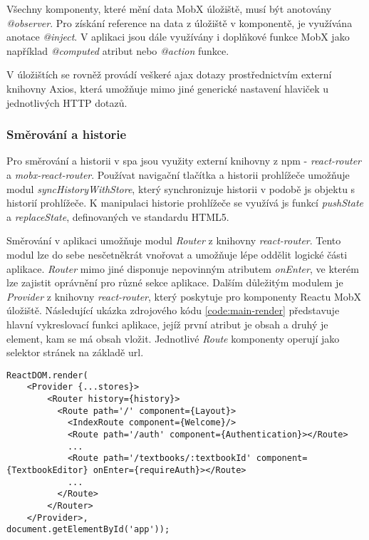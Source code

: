 \documentclass[a4paper,11pt,titlepage,fleqn]{article}
\begin{document}
            Všechny komponenty, které mění data MobX úložiště, musí být anotovány \textit{@observer}. Pro získání reference na data z úložiště v komponentě, je využívána anotace \textit{@inject}. V aplikaci jsou dále využívány i doplňkové funkce MobX jako například \textit{@computed} atribut nebo \textit{@action} funkce. 

            V úložištích se rovněž provádí veškeré \gls{ajax} dotazy prostřednictvím externí knihovny Axios, která umožňuje mimo jiné generické nastavení hlaviček u jednotlivých HTTP dotazů. 
        
        \subsubsection{Směrování a historie}
            Pro směrování a historii v \gls{spa} jsou využity externí knihovny z \gls{npm} - \textit{react-router} a \textit{mobx-react-router}. Používat navigační tlačítka a historii prohlížeče umožňuje modul \textit{syncHistoryWithStore}, který synchronizuje historii v podobě \gls{js} objektu s historií prohlížeče. K manipulaci historie prohlížeče se využívá \gls{js} funkcí \textit{pushState} a \textit{replaceState}, definovaných ve standardu HTML5.

            Směrování v aplikaci umožňuje modul \textit{Router} z knihovny \textit{react-router}. Tento modul lze do sebe nesčetněkrát vnořovat a umožňuje lépe oddělit logické části aplikace. \textit{Router} mimo jiné disponuje nepovinným atributem \textit{onEnter}, ve kterém lze zajistit oprávnění pro různé sekce aplikace. Dalším důležitým modulem je \textit{Provider} z knihovny \textit{react-router}, který poskytuje pro komponenty Reactu MobX úložiště. Následující ukázka zdrojového kódu \ref{code:main-render} představuje hlavní vykreslovací funkci aplikace, jejíž první atribut je obsah a druhý je element, kam se má obsah vložit. Jednotlivé \textit{Route} komponenty operují jako selektor stránek na základě \gls{url}.

\begin{minipage}[c]{0.95\textwidth}
\begin{lstlisting}[language=JS, caption={Hlavní renderovací funkce aplikace},label=code:main-render]
ReactDOM.render(
    <Provider {...stores}>
        <Router history={history}>
          <Route path='/' component={Layout}>
            <IndexRoute component={Welcome}/>
            <Route path='/auth' component={Authentication}></Route>
            ...
            <Route path='/textbooks/:textbookId' component={TextbookEditor} onEnter={requireAuth}></Route>
            ...
          </Route>
        </Router>
    </Provider>,
document.getElementById('app'));
\end{lstlisting}
\end{minipage}
\end{document}
